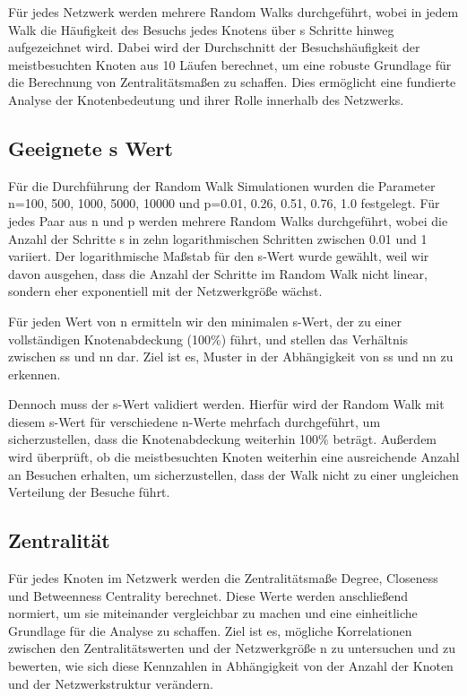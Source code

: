 Für jedes Netzwerk werden mehrere Random Walks durchgeführt, wobei in jedem Walk die Häufigkeit des Besuchs jedes Knotens über s Schritte hinweg aufgezeichnet wird. Dabei wird der Durchschnitt der Besuchshäufigkeit der meistbesuchten Knoten aus 10 Läufen berechnet, um eine robuste Grundlage für die Berechnung von Zentralitätsmaßen zu schaffen. Dies ermöglicht eine fundierte Analyse der Knotenbedeutung und ihrer Rolle innerhalb des Netzwerks. 


\subsection{Geeignete s Wert}
Für die Durchführung der Random Walk Simulationen wurden die Parameter n={100, 500, 1000, 5000, 10000} und p={0.01, 0.26, 0.51, 0.76, 1.0} festgelegt. Für jedes Paar aus n und p werden mehrere Random Walks durchgeführt, wobei die Anzahl der Schritte s in zehn logarithmischen Schritten zwischen 0.01 und 1 variiert. Der logarithmische Maßstab für den s-Wert wurde gewählt, weil wir davon ausgehen, dass die Anzahl der Schritte im Random Walk nicht linear, sondern eher exponentiell mit der Netzwerkgröße wächst.  


Für jeden Wert von n ermitteln wir den minimalen s-Wert, der zu einer vollständigen Knotenabdeckung (100\%) führt, und stellen das Verhältnis zwischen ss und nn dar. Ziel ist es, Muster in der Abhängigkeit von ss und nn zu erkennen. 

Dennoch muss der s-Wert validiert werden. Hierfür wird der Random Walk mit diesem s-Wert für verschiedene n-Werte mehrfach durchgeführt, um sicherzustellen, dass die Knotenabdeckung weiterhin 100\% beträgt. Außerdem wird überprüft, ob die meistbesuchten Knoten weiterhin eine ausreichende Anzahl an Besuchen erhalten, um sicherzustellen, dass der Walk nicht zu einer ungleichen Verteilung der Besuche führt. 

\subsection{Zentralität}
Für jedes Knoten im Netzwerk werden die Zentralitätsmaße Degree, Closeness und Betweenness Centrality berechnet. Diese Werte werden anschließend normiert, um sie miteinander vergleichbar zu machen und eine einheitliche Grundlage für die Analyse zu schaffen. Ziel ist es, mögliche Korrelationen zwischen den Zentralitätswerten und der Netzwerkgröße n zu untersuchen und zu bewerten, wie sich diese Kennzahlen in Abhängigkeit von der Anzahl der Knoten und der Netzwerkstruktur verändern. 

